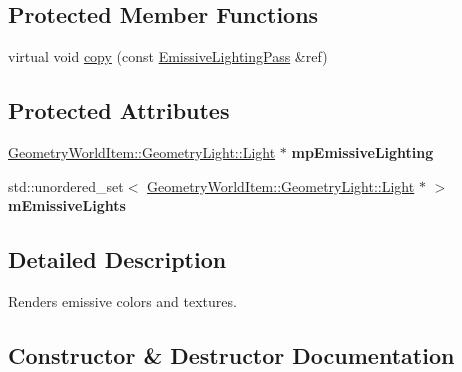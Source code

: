 \subsection*{Protected Member Functions}
\begin{DoxyCompactItemize}
\item 
virtual void \mbox{\hyperlink{class_geometry_engine_1_1_geometry_render_step_1_1_emissive_lighting_pass_a1856a521c04820f16f8f2516c65036d0}{copy}} (const \mbox{\hyperlink{class_geometry_engine_1_1_geometry_render_step_1_1_emissive_lighting_pass}{Emissive\+Lighting\+Pass}} \&ref)
\end{DoxyCompactItemize}
\subsection*{Protected Attributes}
\begin{DoxyCompactItemize}
\item 
\mbox{\label{class_geometry_engine_1_1_geometry_render_step_1_1_emissive_lighting_pass_afc44f3c175dd6b6c78cf5cb967eacb31}} 
\mbox{\hyperlink{class_geometry_engine_1_1_geometry_world_item_1_1_geometry_light_1_1_light}{Geometry\+World\+Item\+::\+Geometry\+Light\+::\+Light}} $\ast$ {\bfseries mp\+Emissive\+Lighting}
\item 
\mbox{\label{class_geometry_engine_1_1_geometry_render_step_1_1_emissive_lighting_pass_a6f984b12dcad05be3c8e8c926215c797}} 
std\+::unordered\+\_\+set$<$ \mbox{\hyperlink{class_geometry_engine_1_1_geometry_world_item_1_1_geometry_light_1_1_light}{Geometry\+World\+Item\+::\+Geometry\+Light\+::\+Light}} $\ast$ $>$ {\bfseries m\+Emissive\+Lights}
\end{DoxyCompactItemize}


\subsection{Detailed Description}
Renders emissive colors and textures. 

\subsection{Constructor \& Destructor Documentation}
\mbox{\label{class_geometry_engine_1_1_geometry_render_step_1_1_emissive_lighting_pass_af05c874fca05ebac313f13bbccbbb4d3}} 
